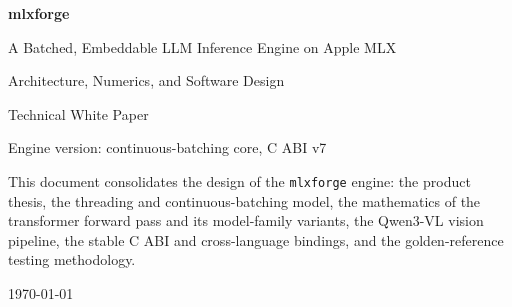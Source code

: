\documentclass[11pt,a4paper]{report}
\newcommand{\code}[1]{\texttt{#1}}
\begin{document}
\begin{titlepage}
  \centering
  \vspace*{2cm}
  {\Huge\bfseries mlxforge\par}
  \vspace{0.6cm}
  {\Large A Batched, Embeddable LLM Inference Engine on Apple MLX\par}
  \vspace{0.4cm}
  {\large Architecture, Numerics, and Software Design\par}
  \vspace{2cm}
  {\large Technical White Paper\par}
  \vspace{0.3cm}
  {\normalsize Engine version: continuous-batching core, C ABI v7\par}
  \vfill
  {\small This document consolidates the design of the \code{mlxforge} engine: the
  product thesis, the threading and continuous-batching model, the mathematics of
  the transformer forward pass and its model-family variants, the Qwen3-VL vision
  pipeline, the stable C ABI and cross-language bindings, and the
  golden-reference testing methodology.\par}
  \vspace{1cm}
  {\small\today\par}
\end{titlepage}
\end{document}
